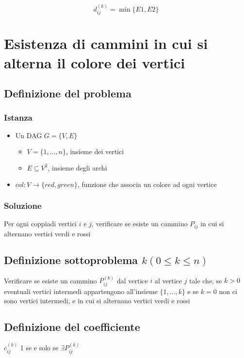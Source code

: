 {
    \large

    $$
    d_{ij}^{(k)} = \min\{E1,E2\}
    $$
}

\newpage
\section{Esistenza di cammini in cui si alterna il colore dei vertici}

\subsection{Definizione del problema}

\subsubsection{Istanza}
\begin{itemize}
    \item Un DAG $G=\{V,E\}$
    \begin{itemize}
        \item $V = \{1, \dots, n\}$, insieme dei vertici
        \item $E \subseteq V^2$, insieme degli archi
    \end{itemize}
    \item $col: V \to \{red, green\}$, funzione che associa un colore ad ogni vertice
\end{itemize}

\subsubsection{Soluzione}
Per ogni coppiadi vertici $i$ e $j$, verificare se esiste un cammino $P_{ij}$ in cui si alternano vertici verdi e rossi

\subsection{Definizione sottoproblema $k(0 \leq k \leq n)$}
Verificare se esiste un cammino $P_{ij}^{(k)}$ dal vertice $i$ al vertice $j$ tale che, se $k>0$ eventuali vertici intermedi appartengono all'insieme $\{1,\dots,k\}$ e se $k=0$ non ci sono vertici intermedi, e in cui si alternano vertici verdi e rossi

\subsection{Definizione del coefficiente}
$c_{ij}^{(k)}$ 1 se e solo se $\exists P_{ij}^{(k)}$

